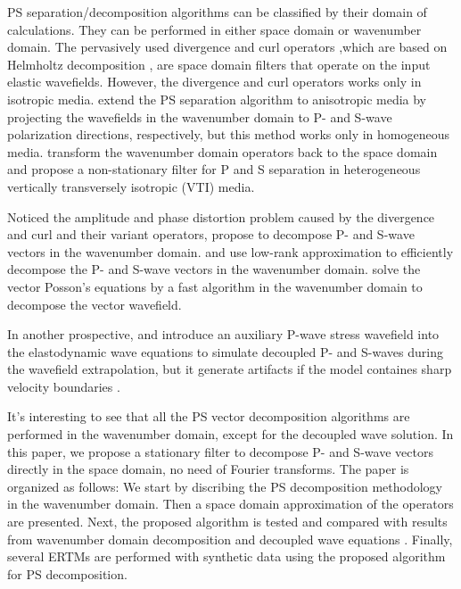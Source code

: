 \documentclass[manuscript,ulem,graphix,revised]{geophysics}
\begin{document}
PS separation/decomposition algorithms can be classified by their domain of calculations. They can be performed in either space domain or wavenumber domain. The pervasively used divergence and curl operators ,which are based on Helmholtz decomposition \citep{aki80}, are space domain filters that operate on the input elastic wavefields. However, the divergence and curl operators works only in isotropic media. \citet{dellinger90} extend the PS separation algorithm to anisotropic media by projecting the wavefields in the wavenumber domain to P- and S-wave polarization directions, respectively, but this method works only in homogeneous media. \citet{yan09} transform the wavenumber domain operators back to the space domain and propose a non-stationary filter for P and S separation in heterogeneous vertically transversely isotropic (VTI) media. 

Noticed the amplitude and phase distortion problem caused by the divergence and curl and their variant operators, \citet{zhang10} propose to decompose P- and S-wave vectors in the wavenumber domain. \citet{cheng14} and \citet{wenlong17} use low-rank approximation to efficiently decompose the P- and S-wave vectors in the wavenumber domain. \citet{zhu17} solve the vector Posson's equations by a fast algorithm in the wavenumber domain to decompose the vector wavefield. 

In another prospective, \citet{ma03} and \citet{wenlong_cmp15} introduce an auxiliary P-wave stress wavefield into the elastodynamic wave equations \citep{virieux84} to simulate decoupled P- and S-waves during the wavefield extrapolation, but it generate artifacts if the model containes sharp velocity boundaries \citep{wenlong_cmp15}. 

It's interesting to see that all the PS vector decomposition algorithms are performed in the wavenumber domain, except for the decoupled wave solution. In this paper, we propose a stationary filter to decompose P- and S-wave vectors directly in the space domain, no need of Fourier transforms. The paper is organized as follows: We start by discribing the PS decomposition methodology in the wavenumber domain. Then a space domain approximation of the operators are presented. Next, the proposed algorithm is tested and compared with results from wavenumber domain decomposition \citep{zhang10} and decoupled wave equations \citep{wenlong_cmp15}. Finally, several ERTMs are performed with synthetic data using the proposed algorithm for PS decomposition.
\end{document}
